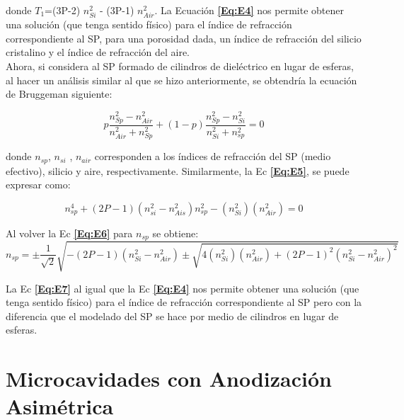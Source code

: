 \documentclass[a4paper,11pt,]{book}
\begin{document}
donde $T_1$=(3P-2) $n^2_{Si}$ - (3P-1) $n^{2}_{Air}$. La Ecuación \textbf{\ref{Eq:E4}} nos permite obtener una solución (que tenga sentido físico) para el índice de refracción correspondiente al SP, para una porosidad dada, un índice de refracción del silicio cristalino y el índice de refracción del aire.\\
Ahora, si considera al SP formado de cilindros de dieléctrico en lugar de esferas, al hacer un análisis similar al que se hizo anteriormente, se obtendría la ecuación de Bruggeman siguiente:


\begin{equation}\label{Eq:E5}
p\frac{n^{2}_{Sp}-n^{2}_{Air}}{n^{2}_{Air}+n^{2}_{Sp}}+(1-p) \frac{n^{2}_{Sp}-n^{2}_{Si}}{n^{2}_{Si}+n^{2}_{sp}}=0
\end{equation}

donde $n_{sp}$, $n_{si}$ , $n_{air}$ corresponden a los índices de refracción del SP (medio efectivo), silicio y aire, respectivamente. Similarmente, la Ec \textbf{\ref{Eq:E5}}, se puede expresar como:

\begin{equation} \label{Eq:E6}
n^{4}_{sp}+(2P-1)(n^{2}_{si}-n^{2}_{Ais}) n^{2}_{sp}- (n^{2}_{Si})(n^{2}_{Air})=0
\end{equation}

Al volver la Ec \textbf{\ref{Eq:E6}} para $n_{sp}$ se obtiene: 
{\small 
\begin{equation} \label{Eq:E7}
n_{sp} = \pm \frac{1}{\sqrt{2}} \sqrt{-(2P-1)(n^{2}_{Si} - n^{2}_{Air}) \pm \sqrt { 4(n^{2}_{Si})(n^{2}_{Air}) + (2P-1)^{2} (n^{2}_{Si} - n^{2}_{Air})^{2}}}
\end{equation} }

La Ec \textbf{\ref{Eq:E7}}  al igual que la Ec \textbf{\ref{Eq:E4}} nos permite obtener una solución (que tenga sentido físico) para el índice de refracción correspondiente al SP pero con la diferencia que el modelado del SP se hace por medio de cilindros en lugar de esferas.

\chapter{Microcavidades con Anodización Asimétrica}
\label{Mo:MiCROAA}
\end{document}
